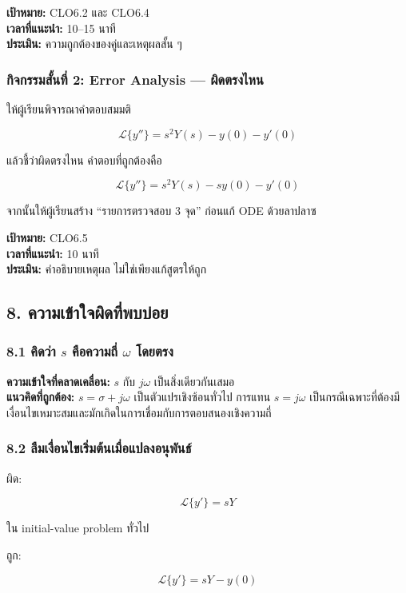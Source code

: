 \textbf{เป้าหมาย:} CLO6.2 และ CLO6.4\\
\textbf{เวลาที่แนะนำ:} 10–15 นาที\\
\textbf{ประเมิน:} ความถูกต้องของคู่และเหตุผลสั้น ๆ

\subsubsection{กิจกรรมสั้นที่ 2: Error Analysis — ผิดตรงไหน}

ให้ผู้เรียนพิจารณาคำตอบสมมติ

\[
\mathcal{L}\{y''\}=s^2Y(s)-y(0)-y'(0)
\]

แล้วชี้ว่าผิดตรงไหน คำตอบที่ถูกต้องคือ

\[
\mathcal{L}\{y''\}=s^2Y(s)-sy(0)-y'(0)
\]

จากนั้นให้ผู้เรียนสร้าง “รายการตรวจสอบ 3 จุด” ก่อนแก้ ODE ด้วยลาปลาซ

\textbf{เป้าหมาย:} CLO6.5\\
\textbf{เวลาที่แนะนำ:} 10 นาที\\
\textbf{ประเมิน:} คำอธิบายเหตุผล ไม่ใช่เพียงแก้สูตรให้ถูก



\subsection{8. ความเข้าใจผิดที่พบบ่อย}

\subsubsection{\texorpdfstring{8.1 คิดว่า $s$ คือความถี่ $\omega$ โดยตรง}{8.1 คิดว่า s คือความถี่ omega โดยตรง}}

\textbf{ความเข้าใจที่คลาดเคลื่อน:} $s$ กับ $j\omega$ เป็นสิ่งเดียวกันเสมอ\\
\textbf{แนวคิดที่ถูกต้อง:} $s=\sigma+j\omega$ เป็นตัวแปรเชิงซ้อนทั่วไป การแทน $s=j\omega$ เป็นกรณีเฉพาะที่ต้องมีเงื่อนไขเหมาะสมและมักเกิดในการเชื่อมกับการตอบสนองเชิงความถี่

\subsubsection{8.2 ลืมเงื่อนไขเริ่มต้นเมื่อแปลงอนุพันธ์}

ผิด:

\[
\mathcal{L}\{y'\}=sY
\]

ใน initial-value problem ทั่วไป

ถูก:

\[
\mathcal{L}\{y'\}=sY-y(0)
\]

